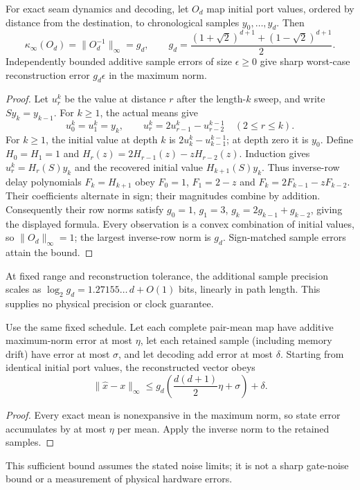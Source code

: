 \begin{theorem}
\label{thm:source-seam-exactconditioning}
For exact seam dynamics and decoding, let $O_d$ map initial port values,
ordered by distance from the destination, to chronological samples
$y_0,\ldots,y_d$. Then
\[
 \kappa_\infty(O_d)=\|O_d^{-1}\|_\infty=g_d,
 \qquad
 g_d=\frac{(1+\sqrt2)^{d+1}+(1-\sqrt2)^{d+1}}2.
\]
Independently bounded additive sample errors of size $\epsilon\geq0$ give
sharp worst-case reconstruction error $g_d\epsilon$ in the maximum norm.
\end{theorem}
\begin{proof}
Let $u_r^k$ be the value at distance $r$ after the length-$k$ sweep, and
write $Sy_k=y_{k-1}$. For $k\geq1$, the actual means give
\[
 u_0^k=u_1^k=y_k,\qquad
 u_r^k=2u_{r-1}^k-u_{r-2}^{k-1}\quad(2\leq r\leq k).
\]
For $k\geq1$, the initial value at depth $k$ is
$2u_k^k-u_{k-1}^{k-1}$; at depth zero it is $y_0$.
Define $H_0=H_1=1$ and $H_r(z)=2H_{r-1}(z)-zH_{r-2}(z)$.
Induction gives $u_r^k=H_r(S)y_k$ and the recovered initial value
$H_{k+1}(S)y_k$. Thus inverse-row delay polynomials $F_k=H_{k+1}$ obey
$F_0=1$, $F_1=2-z$ and $F_k=2F_{k-1}-zF_{k-2}$.
Their coefficients alternate in sign; their magnitudes combine by addition.
Consequently their row norms satisfy
$g_0=1$, $g_1=3$, $g_k=2g_{k-1}+g_{k-2}$, giving the displayed formula.
Every observation is a convex combination of initial values, so
$\|O_d\|_\infty=1$; the largest inverse-row norm is $g_d$.
Sign-matched sample errors attain the bound.
\end{proof}
At fixed range and reconstruction tolerance, the additional sample precision
scales as $\log_2 g_d=1.27155\ldots\,d+O(1)$ bits, linearly in path length.
This supplies no physical precision or clock guarantee.

\begin{corollary}
\label{cor:source-seam-gateerror}
Use the same fixed schedule.
Let each complete pair-mean map have additive maximum-norm error at most
$\eta$, let each retained sample (including memory drift) have error at most
$\sigma$, and let decoding add error at most $\delta$.
Starting from identical initial port values, the reconstructed vector obeys
\[
 \|\widehat x-x\|_\infty
 \leq g_d\left(\frac{d(d+1)}2\eta+\sigma\right)+\delta.
\]
\end{corollary}
\begin{proof}
Every exact mean is nonexpansive in the maximum norm, so state error
accumulates by at most $\eta$ per mean. Apply the inverse norm to the retained
samples.
\end{proof}
This sufficient bound assumes the stated noise limits; it is not a
sharp gate-noise bound or a measurement of physical hardware errors.

